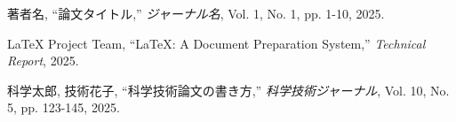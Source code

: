 \begin{thebibliography}{99}
 著者名, ``論文タイトル,'' {\it ジャーナル名}, Vol. 1, No. 1, pp. 1-10, 2025.

 LaTeX Project Team, ``LaTeX: A Document Preparation System,'' {\it Technical Report}, 2025.

 科学太郎, 技術花子, ``科学技術論文の書き方,'' {\it 科学技術ジャーナル}, Vol. 10, No. 5, pp. 123-145, 2025.
\end{thebibliography}
